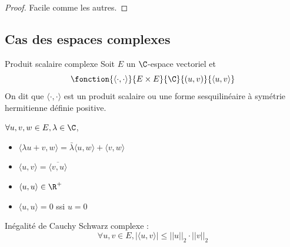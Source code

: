 \begin{proof}
    Facile comme les autres.
\end{proof}

\subsection{Cas des espaces complexes}

\begin{definition}{Produit scalaire complexe}{}
    Soit $E$ un $\C$-espace vectoriel et 
    $$\fonction{\langle\cdot, \cdot\rangle}{E \times E}{\C}{(u, v)}{\langle u, v \rangle}$$
    On dit que $\langle\cdot, \cdot\rangle$ est un produit scalaire ou une forme 
    sesquilinéaire à symétrie hermitienne définie positive. 

    $\forall u, v, w \in E, \lambda \in \C$, 

    \begin{itemize}
        \item $\langle\lambda u + v, w \rangle = \bar \lambda\langle u, w \rangle + \langle v, w \rangle$
        \item $\langle u, v \rangle = \overline{\langle v, u \rangle}$
        \item $\langle u, u \rangle \in \R^+$
        \item $\langle u, u \rangle = 0$ ssi $u=0$
    \end{itemize}
\end{definition}

\begin{theorement}{}{}
    Inégalité de Cauchy Schwarz complexe :
    $$\forall u, v \in E, |\langle u, v \rangle| \leqslant ||u||_2 \cdot ||v||_2$$
\end{theorement}


